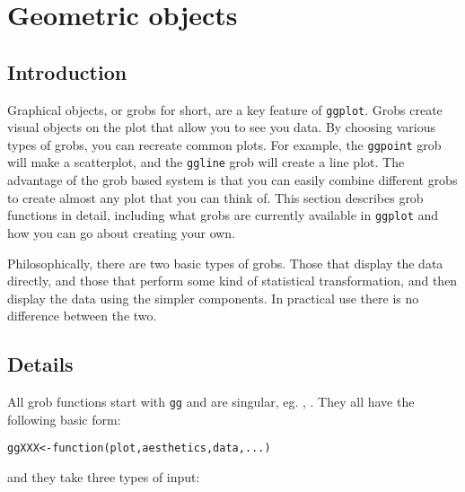 


\chapter{Geometric objects}

\section{Introduction}\label{sec:introduction}

Graphical objects, or grobs for short, are a key feature of {\tt ggplot}.  Grobs create visual objects on the plot that allow you to see you data.  By choosing various types of grobs, you can recreate common plots.  For example, the {\tt ggpoint} grob will make a scatterplot, and the {\tt ggline} grob will create a line plot.  The advantage of the grob based system is that you can easily combine different grobs to create almost any plot that you can think of.  This section describes grob functions in detail, including what grobs are currently available in {\tt ggplot} and how you can go about creating your own.

Philosophically, there are two basic types of grobs.  Those that display the data directly, and those that perform some kind of statistical transformation, and then display the data using the simpler components.  In practical use there is no difference between the two.
 
\section{Details}\label{sec:details}

All grob functions start with {\tt gg} and are singular, eg. , .  They all have the following basic form:

\begin{alltt}
ggXXX <- function(plot, aesthetics, data, ...) {}
\end{alltt}

\noindent and they take three types of input:

